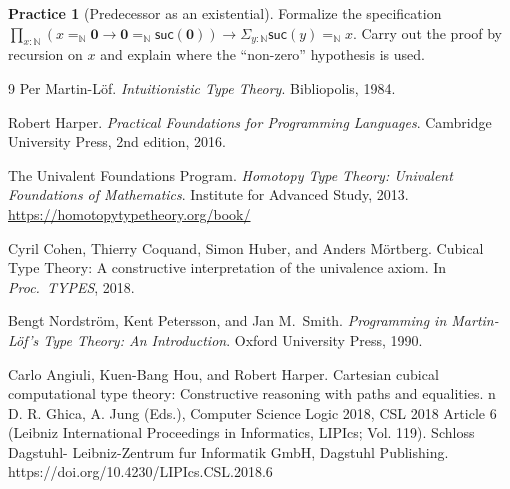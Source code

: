 \documentclass[11pt]{article}
\newcommand{\Nat}{\mathbb{N}}
\newcommand{\zero}{\mathbf{0}}
\newcommand{\suc}{\mathsf{suc}}
\newcommand{\Id}[3]{#1 =_{#2} #3}
\newcommand{\False}{\Id{\zero}{\Nat}{\suc(\zero)}}
\newcommand{\negtype}[1]{#1 \to \False}
\theoremstyle{definition}
\newtheorem{exercise}[definition]{Practice}
\theoremstyle{plain}
\theoremstyle{remark}
\begin{document}
\begin{exercise}[Predecessor as an existential]\label{ex:pred}
Formalize the specification $\prod_{x:\Nat} (\negtype{\Id{x}{\Nat}{\zero}}) \to \Sigma_{y:\Nat} \Id{\suc(y)}{\Nat}{x}$.
Carry out the proof by recursion on $x$ and explain where the ``non-zero'' hypothesis is used.
\end{exercise}


\begin{thebibliography}{9}
Per Martin-L\"of.
\newblock \emph{Intuitionistic Type Theory}.
\newblock Bibliopolis, 1984.

Robert Harper.
\newblock \emph{Practical Foundations for Programming Languages}.
\newblock Cambridge University Press, 2nd edition, 2016.

The Univalent Foundations Program.
\newblock \emph{Homotopy Type Theory: Univalent Foundations of Mathematics}.
\newblock Institute for Advanced Study, 2013. \url{https://homotopytypetheory.org/book/}

Cyril Cohen, Thierry Coquand, Simon Huber, and Anders M\"ortberg.
\newblock Cubical Type Theory: A constructive interpretation of the univalence axiom.
\newblock In \emph{Proc.\ TYPES}, 2018.

Bengt Nordström, Kent Petersson, and Jan M.~Smith.
\newblock \emph{Programming in Martin-Löf's Type Theory: An Introduction}.
\newblock Oxford University Press, 1990.


Carlo Angiuli, Kuen-Bang Hou, and Robert Harper.
\newblock Cartesian cubical computational type theory: Constructive reasoning with paths and equalities.
\newblock n D. R. Ghica, A. Jung (Eds.), Computer Science Logic 2018, CSL 2018 Article 6 (Leibniz International Proceedings in Informatics, LIPIcs; Vol. 119). Schloss Dagstuhl- Leibniz-Zentrum fur Informatik GmbH, Dagstuhl Publishing. https://doi.org/10.4230/LIPIcs.CSL.2018.6
\end{thebibliography}
\end{document}
